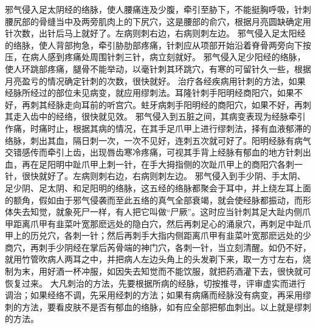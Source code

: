 \documentclass[a4paper,12pt,UTF8,twoside]{ctexbook}
\begin{document}
邪气侵入足太阴经的络脉，使人腰痛连及少腹，牵引至胁下，不能挺胸呼吸，针刺腰尻部的骨缝当中及两旁肌肉上的下尻穴，这是腰部的俞穴，根据月亮圆缺确定用针次数，出针后马上就好了。左病则刺右边，右病则刺左边。
邪气侵入足太阳经的络脉，使人背部拘急，牵引胁肋部疼痛，针刺应从项部开始沿着脊骨两旁向下按压，在病人感到疼痛处周围针刺三针，病立刻就好。
邪气侵入足少阳经的络脉，使人环跳部疼痛，腿骨不能举动，以毫针刺其环跳穴，有寒的可留针久一些，根据月亮盈亏的情况确定针刺的次数，很快就好。
治疗各经疾病用针刺的方法，如果经脉所经过的部位未见病变，就应用缪刺法。耳隆针刺手阳明经商阳穴，如果不好，再刺其经脉走向耳前的听宫穴。蛀牙病刺手阳明经的商阳穴，如果不好，再刺其走入齿中的经络，很快就见效。
邪气侵入到五脏之间，其病变表现为经脉牵引作痛，时痛时止，根据其病的情况，在其手足爪甲上进行缪刺法，择有血液郁滞的络脉，刺出其血，隔日刺一次，一次不见好，连刺五次就可好了。阳明经脉有病气交错感传而牵引上齿，出现唇齿寒冷疼痛，可视其手背上经脉有郁血的地方针刺出血，再在足阳明中趾爪甲上刺一针，在手大拇指侧的次趾爪甲上的商阳穴各刺一针，很快就好了。左病则刺右边，右病则刺左边。
邪气侵入到手少阴、手太阴、足少阴、足太阴、和足阳明的络脉，这五经的络脉都聚会于耳中，并上绕左耳上面的额角，假如由于邪气侵袭而至此五络的真气全部衰竭，就会使经脉都振动，而形体失去知觉，就象死尸一样，有人把它叫做“尸厥”。这时应当针刺其足大趾内侧爪甲距离爪甲有韭菜叶宽那麽远处的隐白穴，然后再刺足心的涌泉穴，再刺足中趾爪甲上的历兑穴，各刺一针；然后再刺手大指内侧距离爪甲有韭菜叶宽那麽远处的少商穴，再刺手少阴经在掌后芮骨端的神门穴，各刺一针，当立刻清醒。如仍不好，就用竹管吹病人两耳之中，并把病人左边头角上的头发剃下来，取一方寸左右，烧制为末，用好酒一杯冲服，如因失去知觉而不能饮服，就把药酒灌下去，很快就可恢复过来。
大凡刺治的方法，先要根据所病的经脉，切按推寻，评审虚实而进行调治；如果经络不调，先采用经刺的方法；如果有病痛而经脉没有病变，再采用缪刺的方法，要看皮肤不是否有郁血的络脉，如有应全部把郁血刺出。以上就是缪刺的方法。
\end{document}
